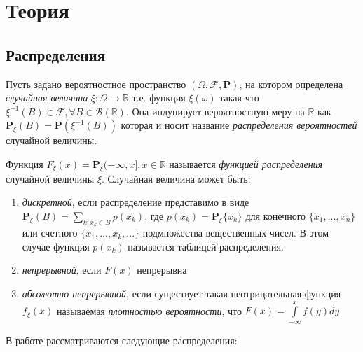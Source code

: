 \documentclass[12pt,a4paper]{article}
\begin{document}
\pagebreak

\section{Теория}
\subsection{Распределения}
Пусть задано вероятностное пространство $(\Omega, \mathcal{F}, \mathbf{P})$, на котором определена \textit{случайная величина} $\xi:\Omega\to\mathbb{R}$ т.е. функция $\xi(\omega)$ такая что $\xi^{-1}(B)\in\mathcal{F},\forall{B\in\mathcal{B}(\mathbb{R})}$. Она индуцирует вероятностную меру на $\mathbb{R}$ как $\mathbf{P}_\xi(B)=\mathbf{P}(\xi^{-1}(B))$ которая и носит название \textit{распределения вероятностей} случайной величины\cite{shiryaev}.

Функция $F_\xi(x)=\mathbf{P}_\xi\mathopen{(-\infty}, x\mathclose{ ] },x\in\mathbb{R}$ называется \textit{функцией распределения} случайной величины $\xi$. Случайная величина может быть:

\begin{enumerate}
	\item \textit{дискретной}, если распределение представимо в виде $\mathbf{P}_\xi(B)=\sum\limits_{k:x_k\in{B}}{p(x_k)}$, где \newline
	$p(x_k)=\mathbf{P}_\xi{\{ x_k \}}$ для конечного $\{x_1, ..., x_n\}$ или счетного 
	$\{x_1, ..., x_k, ...\}$ подмножества вещественных чисел. В этом случае функция $p(x_k)$ называется таблицей распределения.
	
	\item \textit{непрерывной}, если $F(x)$ непрерывна
	
	\item \textit{абсолютно непрерывной}, если существует такая неотрицательная функция $f_\xi(x)$ называемая \textit{плотностью вероятности}, что $F(x)=\int\limits_{-\infty}^{x}{f(y)dy}$
\end{enumerate}

В работе рассматриваются следующие распределения:
\end{document}
